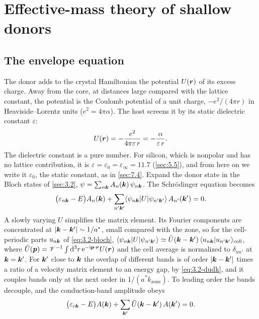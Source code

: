 \section{Effective-mass theory of shallow donors}\label{app:D.23}

\subsection*{The envelope equation}

The donor adds to the crystal Hamiltonian the potential $U(\bm{r})$ of its excess charge. Away from the core, at distances large compared with the lattice constant, the potential is the Coulomb potential of a unit charge, $-e^2/(4\pi r)$ in Heaviside--Lorentz units ($e^2 = 4\pi\alpha$). The host screens it by its static dielectric constant $\varepsilon$:
\begin{equation*}
  U(\bm{r}) = -\frac{e^2}{4\pi\varepsilon\,r} = -\frac{\alpha}{\varepsilon\,r} .
\end{equation*}
The dielectric constant is a pure number. For silicon, which is nonpolar and has no lattice contribution, it is $\varepsilon = \varepsilon_0 = \varepsilon_\infty = 11.7$ (\cref{sec:5.5}), and from here on we write it $\varepsilon_0$, the static constant, as in \cref{sec:7.4}. Expand the donor state in the Bloch states of \cref{sec:3.2}, $\psi = \sum_{n\bm{k}}A_n(\bm{k})\,\psi_{n\bm{k}}$. The Schrödinger equation becomes
\begin{equation*}
  \bigl(\varepsilon_{n\bm{k}} - E\bigr)A_n(\bm{k}) + \sum_{n'\bm{k}'}\langle\psi_{n\bm{k}}|U|\psi_{n'\bm{k}'}\rangle\,A_{n'}(\bm{k}') = 0 .
\end{equation*}
A slowly varying $U$ simplifies the matrix element. Its Fourier components are concentrated at $|\bm{k} - \bm{k}'| \sim 1/a^*$, small compared with the zone, so for the cell-periodic parts $u_{n\bm{k}}$ of \cref{eq:3.2-bloch}, $\langle\psi_{n\bm{k}}|U|\psi_{n'\bm{k}'}\rangle \simeq \tilde U(\bm{k} - \bm{k}')\,\langle u_{n\bm{k}}|u_{n'\bm{k}'}\rangle_{\mathrm{cell}}$, where $\tilde U(\bm{p}) = \mathscr{V}^{-1}\int\mathrm{d}^3r\,\mathrm{e}^{-\mathrm{i}\bm{p}\cdot\bm{r}}U(\bm{r})$ and the cell average is normalized to $\delta_{nn'}$ at $\bm{k} = \bm{k}'$. For $\bm{k}'$ close to $\bm{k}$ the overlap of different bands is of order $|\bm{k} - \bm{k}'|$ times a ratio of a velocity matrix element to an energy gap, by \cref{eq:3.2-dudk}, and it couples bands only at the next order in $1/(a^*k_{\mathrm{zone}})$. To leading order the bands decouple, and the conduction-band amplitude obeys
\begin{equation*}
  \bigl(\varepsilon_{c\bm{k}} - E\bigr)A(\bm{k}) + \sum_{\bm{k}'}\tilde U(\bm{k} - \bm{k}')\,A(\bm{k}') = 0 .
\end{equation*}

